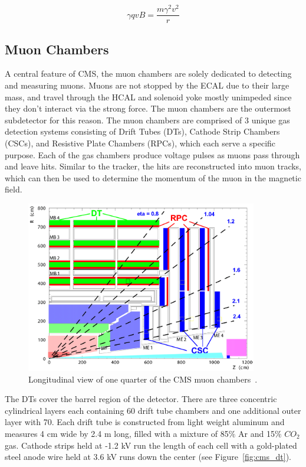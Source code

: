 \begin{equation}
\label{eqn:lorentz_qvb}
 \gamma qvB = \frac{m\gamma^{2}v^{2}}{r}
\end{equation}

\subsection{Muon Chambers}
A central feature of CMS, the muon chambers are solely dedicated to detecting and measuring muons.
Muons are not stopped by the ECAL due to their large mass, and travel through the HCAL and solenoid yoke mostly unimpeded since they don't interact via the strong force.
The muon chambers are the outermost subdetector for this reason. The muon chambers are comprised of 3 unique gas detection systems consisting of Drift Tubes (DTs),
Cathode Strip Chambers (CSCs), and Resistive Plate Chambers (RPCs), which each serve a specific purpose. Each of the gas chambers produce voltage pulses as muons pass through and leave hits.
Similar to the tracker, the hits are reconstructed into muon tracks, which can then be used to determine the momentum of the muon in the magnetic field.  

\begin{figure}[hbtp]
 \begin{center}
   \includegraphics[width=0.9\textwidth]{ch3_figs/cms_muonchamber.pdf}
   \caption[Longitudinal view of the CMS muon chambers]{Longitudinal view of one quarter of the CMS muon chambers~\cite{cms_bluebook}.}
   \label{fig:cms_muonchamber}
 \end{center}
\end{figure}

The DTs cover the barrel region of the detector. There are three concentric cylindrical layers each containing 60 drift tube chambers and one additional outer layer with 70.
Each drift tube is constructed from light weight aluminum and measures 4 cm wide by 2.4 m long, filled with a mixture of 85$\%$ Ar and 15$\%$ $CO_{2}$ gas.
Cathode strips held at -1.2 kV run the length of each cell with a gold-plated steel anode wire held at 3.6 kV runs down the center (see Figure~\ref{fig:cms_dt}).

